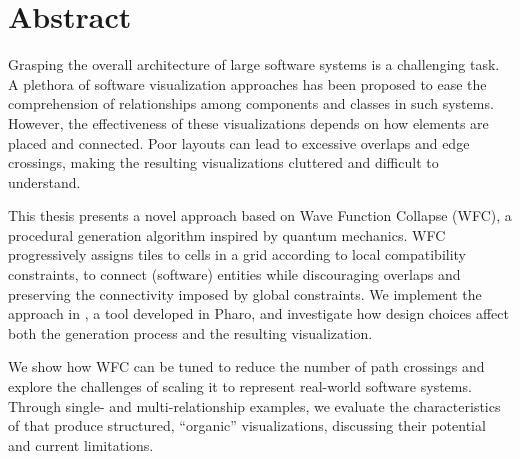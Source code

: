 \documentclass[../main.tex]{subfiles}
\begin{document}
\chapter*{Abstract}
\label{chap:abstract}
Grasping the overall architecture of large software systems is a challenging task. A plethora of software visualization approaches has been proposed to ease the comprehension of relationships among components and classes in such systems. However, the effectiveness of these visualizations depends on how elements are placed and connected. Poor layouts can lead to excessive overlaps and edge crossings, making the resulting visualizations cluttered and difficult to understand.

This thesis presents a novel approach based on Wave Function Collapse (WFC), a procedural generation algorithm inspired by quantum mechanics. WFC progressively assigns tiles to cells in a grid according to local compatibility constraints, to connect (software) entities while discouraging overlaps and preserving the connectivity imposed by global constraints. We implement the approach in \wassis, a tool developed in Pharo, and investigate how design choices affect both the generation process and the resulting visualization.

We show how WFC can be tuned to reduce the number of path crossings and explore the challenges of scaling it to represent real-world software systems. Through single- and multi-relationship examples, we evaluate the characteristics of \wassis that produce structured, ``organic'' visualizations, discussing their potential and current limitations.
\end{document}
